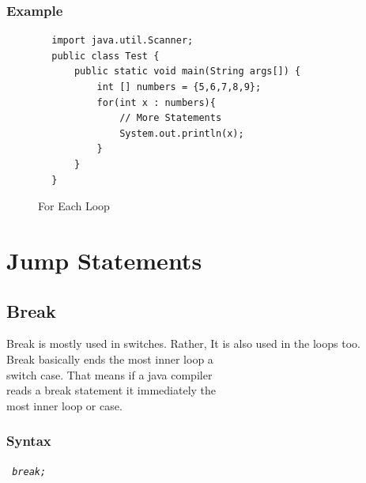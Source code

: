 \documentclass[openany]{book}  %
\begin{document}
\subsubsection{Example}
\begin{center}
    \begin{verbatim}
        import java.util.Scanner;
        public class Test {
            public static void main(String args[]) {
                int [] numbers = {5,6,7,8,9};
                for(int x : numbers){
                    // More Statements
                    System.out.println(x);
                }
            }
        }
    \end{verbatim}
\end{center}
% 
%
\begin{figure}[htbp]
    \begin{center}
        \caption{For Each Loop}
    \end{center}
\end{figure}

% 
% 
\section{Jump Statements}
% 
% 
\subsection{Break}
Break is mostly used in switches.
Rather, It is also used in the loops too. \\
Break basically ends the most inner loop a \\
switch case. That means if a java compiler \\
reads a break statement it immediately the \\
most inner loop or case.

\newpage

% 
% 
\subsubsection{Syntax}
\begin{center}
    \tt{
        \textit{break;}
    }
\end{center}
% 
%
\end{document}
